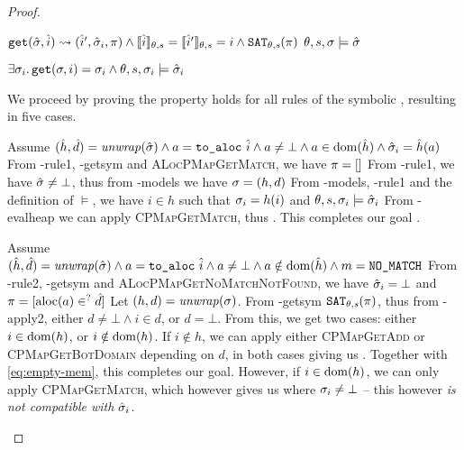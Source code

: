 \begin{proof}

\pfassume \begin{hypvlist}
 $\texttt{get}(\hat{\sigma},\hat{i})\rightsquigarrow(\hat{i}', \hat{\sigma}_i, \pi) \land \llbracket\hat{i}\rrbracket_{\theta,s}=\llbracket\hat{i}'\rrbracket_{\theta,s}=i \land \texttt{SAT}_{\mathit{\theta,s}}(\pi)$
 $\theta,s,\sigma\models\hat{\sigma}$
\end{hypvlist}
\pfprove \begin{goalvlist}
 $\exists \sigma_i \ldotp \texttt{get}(\sigma, i)=\sigma_i \land \theta,s,\sigma_i \models \hat{\sigma}_i$
\end{goalvlist}

We proceed by proving the property holds for all rules of the symbolic , resulting in five cases.


\begin{hypvlist}
 Assume $(\hat{h},\hat{d})={\operatorname{\mathit{unwrap}}}(\hat{\sigma}) \land a = \texttt{to\_aloc}~\hat{i} \land a \neq \bot \land a\in\operatorname{dom}(\hat{h}) \land \hat{\sigma}_i=\hat{h}(a)$
 From \hyp{rule1}, \hyp{getsym} and \textsc{ALocPMapGetMatch}, we have $\pi=[]$
 From \hyp{rule1}, we have $\hat{\sigma}\neq\bot$, thus from \hyp{models} we have $\sigma=(h, d)$
 From \hyp{models}, \hyp{rule1} and the definition of $\models$, we have $i\in h$ such that $\sigma_i=h(i)$ and ${\theta,s,\sigma_i\models\hat{\sigma}_i}$
 From \hyp{evalheap} we can apply \textsc{CPMapGetMatch}, thus . This completes our goal .
\end{hypvlist}


\begin{hypvlist}
 Assume $(\hat{h},\hat{d})={\operatorname{\mathit{unwrap}}}(\hat{\sigma}) \land a = \texttt{to\_aloc}~\hat{i} \land a \neq \bot \land a\notin\operatorname{dom}(\hat{h}) \land m=\texttt{NO\_MATCH}$
 From \hyp{rule2}, \hyp{getsym} and \textsc{ALocPMapGetNoMatchNotFound}, we have $\hat{\sigma}_i=\bot$ and ${\pi=[\text{aloc}(a) \in^? \hat{d}]}$%
 Let $(h,d)={\operatorname{\mathit{unwrap}}}(\sigma)$.
 From \hyp{getsym} $\texttt{SAT}_{\mathit{\theta,s}}(\pi)$, thus from \hyp{apply2}, either $d\neq\bot\land i\in d$, or $d=\bot$.
 From this, we get two cases: either $i\in \operatorname{dom}(h)$, or $i\notin \operatorname{dom}(h)$.
 If $i\notin h$, we can apply either \textsc{CPMapGetAdd} or \textsc{CPMapGetBotDomain} depending on $d$, in both cases giving us . Together with \ref{eq:empty-mem}, this completes our goal.
 {\color{red}However, if $i\in \operatorname{dom}(h)$, we can only apply \textsc{CPMapGetMatch}, which however gives us  where $\sigma_i\neq\bot$ -- this however \emph{is not compatible with $\hat{\sigma}_i$}.}
\end{hypvlist}


\end{proof}
